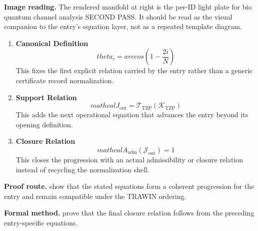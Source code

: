 \begin{samepage}
\noindent\begin{minipage}[t]{0.45\linewidth}
\vspace{0pt}
\raggedright
\scriptsize\textbf{Image reading.} The rendered manifold at right is the per-ID light plate for bio quantum channel analysis SECOND PASS. It should be read as the visual companion to the entry's equation layer, not as a repeated template diagram.\par
\end{minipage}\hfill
\begin{minipage}[t]{0.53\linewidth}
\vspace*{-0.10in}
\raggedright
{}
\end{minipage}
\end{samepage}

\clearpage


\begin{enumerate}[leftmargin=1.6em,itemsep=9pt,topsep=6pt]
\item \textbf{Canonical Definition}
\[
theta_{i}=arccos(1-\frac{2i}{N})
\]
This fixes the first explicit relation carried by the entry rather than a generic certificate record normalization.

\item \textbf{Support Relation}
\[
mathcal{J}_{\mathrm{out}} = \mathcal{T}_{\mathrm{TZP}}\!\left(\mathcal{K}_{\mathrm{TZP}}\right)
\]
This adds the next operational equation that advances the entry beyond its opening definition.

\item \textbf{Closure Relation}
\[
mathcal{A}_{\mathrm{adm}}\!\left(\mathcal{J}_{\mathrm{out}}\right)=1
\]
This closes the progression with an actual admissibility or closure relation instead of recycling the normalization shell.
\end{enumerate}

\textbf{Proof route.} show that the stated equations form a coherent progression for the entry and remain compatible under the TRAWIN ordering.

\textbf{Formal method.} prove that the final closure relation follows from the preceding entry-specific equations.

\medskip
{}

